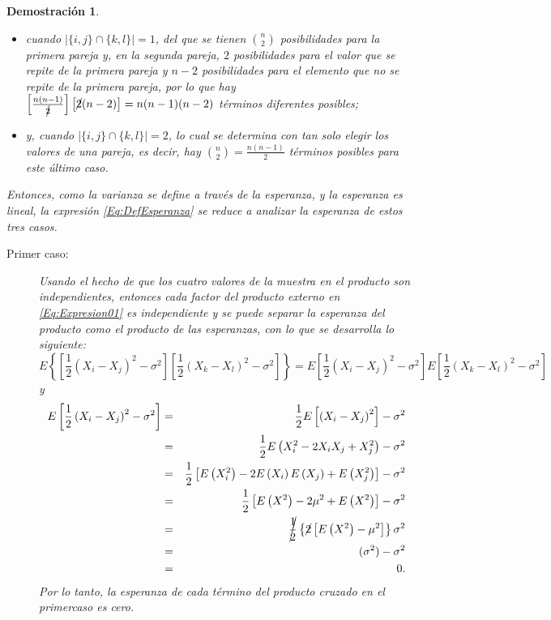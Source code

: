 \documentclass[a4paper,11pt]{article}
\theoremstyle{teoremas}
\theoremstyle{ejemplos}
\theoremstyle{definiciones}
\theoremstyle{lemas}
\newtheorem*{demostracion}{Demostraci\'on}
\begin{document}
\begin{demostracion}
\begin{itemize}
  \item cuando $\left| \{ i,j \} \cap \{ k,l \} \right|= 1$, del que se tienen $\binom{n}{2}$ posibilidades para la primera pareja y, en la segunda pareja, $2$ posibilidades para el valor que se repite de la primera pareja y $n-2$ posibilidades para el elemento que no se repite de la primera pareja, por lo que hay $\left[ \frac{n(n-1)}{\cancel{2}} \right] \left[ \cancel{2}(n-2) \right] = n(n-1)(n-2)$ t\'erminos diferentes posibles;
  \item y, cuando $\left| \{ i,j \} \cap \{ k,l \} \right| = 2$, lo cual se determina con tan solo 
  elegir los valores de una pareja, es decir, hay $\binom{n}{2} = \frac{n(n-1)}{2}$ t\'erminos posibles para este \'ultimo caso.
 \end{itemize}
 Entonces, como la varianza se define a trav\'es de la esperanza, y la esperanza es lineal, la expresi\'on \ref{Eq:DefEsperanza} se reduce a analizar la esperanza de estos tres casos.
 \begin{description}
  \item[Primer caso:] Usando el hecho de que los cuatro valores de la muestra en el producto son independientes, entonces cada factor del producto externo en \ref{Eq:Expresion01} es independiente y se puede separar la esperanza del producto como el producto de las esperanzas, con lo que se desarrolla lo siguiente:
  \begin{equation*}
   E\left\{ \left[ \frac{1}{2}\left( X_i - X_j \right)^2 - \sigma^2 \right] \left[ \frac{1}{2}\left( X_k - X_l \right)^2 - \sigma^2 \right] \right\} = E\left[ \frac{1}{2}\left( X_i - X_j \right)^2 - \sigma^2 \right] E\left[ \frac{1}{2}\left( X_k - X_l \right)^2 - \sigma^2 \right]
  \end{equation*}
  y
  \begin{eqnarray*}
   E\left[ \frac{1}{2}\left( X_i - X_j \right)^2 - \sigma^2 \right] & = & \frac{1}{2}E\left[ \left( X_i - X_j \right)^2 \right] - \sigma^2 \\ 
     & = & \frac{1}{2} E\left( X_i^2 - 2X_iX_j + X_j^2 \right) - \sigma^2 \\
     & = & \frac{1}{2}\left[ E\left( X_i^2 \right) - 2E\left( X_i \right)E\left( X_j \right) + E\left( X_j^2 \right) \right] - \sigma^2 \\
     & = & \frac{1}{2}\left[ E\left( X^2 \right) - 2\mu^2 + E\left( X^2 \right) \right] - \sigma^2 \\ 
     & = & \cancel{\frac{1}{2} } \left\{ \cancel{2}\left[ E\left( X^2 \right) - \mu^2 \right] \right\}  \sigma^2 \\
     & = & (\sigma^2) - \sigma^2 \\ 
     & = & 0.
  \end{eqnarray*}
  Por lo tanto, la esperanza de cada t\'ermino del producto cruzado en el primercaso es cero. 


\end{description}
\end{demostracion}
\end{document}
